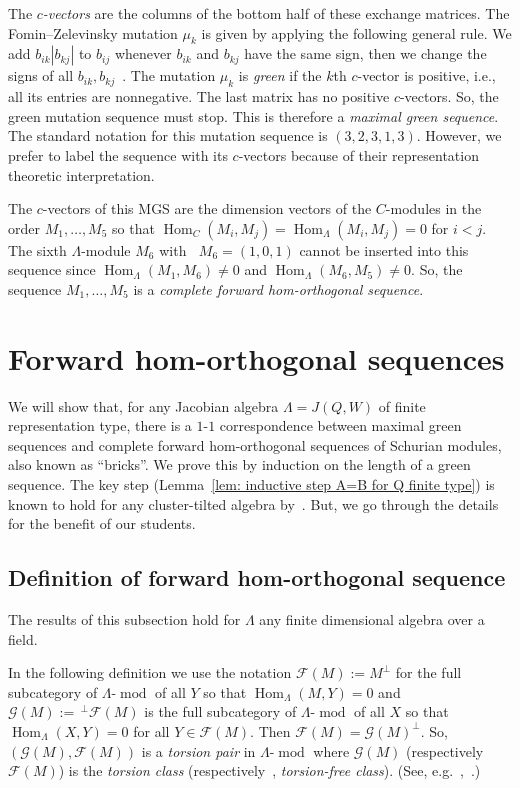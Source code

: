\documentclass[10pt]{amsart}
\theoremstyle{definition}
\newcommand{\eg}{e.g.\ }
\newcommand{\resp}{respectively\ }
\DeclareMathOperator{\Hom}{Hom}%
\DeclareMathOperator{\undim}{\underline{dim}}
\DeclareMathOperator{\modr}{mod}
\newcommand{\cF}{\ensuremath{{\mathcal{F}}}}
\newcommand{\cG}{\ensuremath{{\mathcal{G}}}}
\begin{document}
The \emph{$c$-vectors} are the columns of the bottom half of these exchange matrices. The Fomin--Zelevinsky mutation $\mu_k$ is given by applying the following general rule. We add $b_{ik}|b_{kj}|$ to $b_{ij}$ whenever $b_{ik}$ and $b_{kj}$ have the same sign, then we change the signs of all $b_{ik},b_{kj}$~\cite{FZ4}. The mutation $\mu_k$ is \emph{green} if the $k$th $c$-vector is positive, i.e., all its entries are nonnegative. The last matrix has no positive $c$-vectors. So, the green mutation sequence must stop. This is therefore a \emph{maximal green sequence}. The standard notation for this mutation sequence is $(3,2,3,1,3)$. However, we prefer to label the sequence with its $c$-vectors because of their representation theoretic interpretation.


The $c$-vectors of this MGS are the dimension vectors of the $C$-modules in the order $M_1,\ldots,M_5$ so that $\Hom_{C}(M_i,M_j)=\Hom_{\Lambda}(M_i,M_j)=0$ for $i<j$. The sixth $\Lambda$-module $M_6$ with $\undim M_6=(1,0,1)$ cannot be inserted into this sequence since $\Hom_\Lambda(M_1,M_6)\neq 0$ and $\Hom_\Lambda(M_6,M_5)\neq 0$. So, the sequence $M_1,\ldots,M_5$ is a \emph{complete forward hom-orthogonal sequence}.

\setcounter{section}{1}
\section{Forward hom-orthogonal sequences}\label{sect2}


We will show that, for any Jacobian algebra $\Lambda=J(Q,W)$ of finite representation type, there is a $1$-$1$ correspondence between maximal green sequences and complete forward hom-orthogonal sequences of Schurian modules, also known as ``bricks''. We prove this by induction on the length of a green sequence. The key step (Lemma~\ref{lem: inductive step A=B for Q finite type}) is known to hold for any cluster-tilted algebra by~\cite{BIRSm}.
But, we go through the details for the benefit of our students.
\subsection{Definition of forward hom-orthogonal sequence}

The results of this subsection hold for $\Lambda$ any finite dimensional algebra over a field.

In the following definition we use the notation $\cF(M):=M^\perp$ for the full subcategory of $\Lambda\text{-}\modr$ of all $Y$ so that $\Hom_\Lambda(M,Y)=0$ and $\cG(M):=\,^\perp\cF(M)$ is the full subcategory of $\Lambda\text{-}\modr$ of all $X$ so that $\Hom_\Lambda(X,Y)=0$ for all $Y\in\cF(M)$. Then $\cF(M)=\cG(M)^\perp$. So, $(\cG(M),\cF(M))$ is a \emph{torsion pair} in $\Lambda\text{-}\modr$ where $\cG(M)$ (\resp  $\cF(M)$) is the \emph{torsion class} (\resp , \emph{torsion-free class}). (See, \eg ,~\cite{BeRe}.) 
\end{document}
